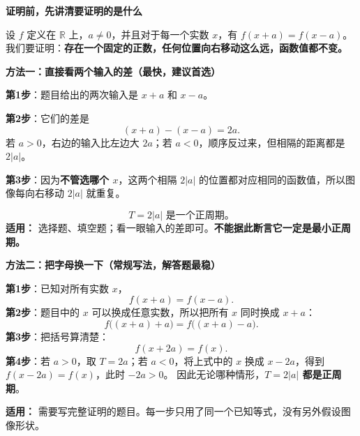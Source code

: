 \clearpage
\begin{proofbox}
\textbf{\textcolor{CProof}{证明前，先讲清要证明的是什么}}

设 $f$ 定义在 $\mathbb R$ 上，$a\ne0$，并且对于每一个实数 $x$，有 $f(x+a)=f(x-a)$。
我们要证明：\textbf{存在一个固定的正数，任何位置向右移动这么远，函数值都不变。}

\medskip
\textbf{\textcolor{CProof}{方法一：直接看两个输入的差（最快，建议首选）}}



\textbf{第1步}：题目给出的两次输入是 $x+a$ 和 $x-a$。

\textbf{第2步}：它们的差是
\[
(x+a)-(x-a)=2a.
\]
若 $a>0$，右边的输入比左边大 $2a$；若 $a<0$，顺序反过来，但相隔的距离都是 $2|a|$。

\textbf{第3步}：因为\textbf{不管选哪个 $x$}，这两个相隔 $2|a|$ 的位置都对应相同的函数值，所以图像每向右移动 $2|a|$ 就重复。

\[
\boxed{T=2|a|\text{ 是一个正周期。}}
\]
\textbf{适用：} 选择题、填空题；看一眼输入的差即可。\textbf{不能据此断言它一定是最小正周期。}

\medskip

\end{proofbox}
\clearpage
\begin{proofbox}
\textbf{\textcolor{CProof}{方法二：把字母换一下（常规写法，解答题最稳）}}



\textbf{第1步}：已知对所有实数 $x$，
\[
f(x+a)=f(x-a).
\]
\textbf{第2步}：题目中的 $x$ 可以换成任意实数，所以把所有 $x$ 同时换成 $x+a$：
\[
f\big((x+a)+a\big)=f\big((x+a)-a\big).
\]
\textbf{第3步}：把括号算清楚：
\[
\boxed{f(x+2a)=f(x).}
\]
\textbf{第4步}：若 $a>0$，取 $T=2a$；若 $a<0$，将上式中的 $x$ 换成 $x-2a$，得到 $f(x-2a)=f(x)$，此时 $-2a>0$。
因此无论哪种情形，\textbf{$T=2|a|$ 都是正周期}。

\textbf{适用：} 需要写完整证明的题目。每一步只用了同一个已知等式，没有另外假设图像形状。

\medskip

\end{proofbox}
\clearpage
